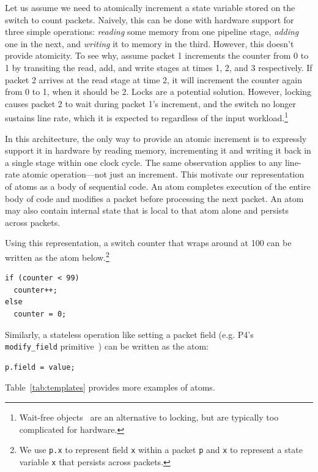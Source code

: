 Let us assume we need to atomically increment a state variable stored
on the switch to count packets. Naively, this can be done with
hardware support for three simple operations: \textit{reading} some
memory from one pipeline stage, \textit{adding} one in the next, and
\textit{writing} it to memory in the third. However, this doesn't
provide atomicity. To see why, assume packet 1 increments the counter
from 0 to 1 by transiting the read, add, and write stages at times 1,
2, and 3 respectively.  If packet 2 arrives at the read stage at time
2, it will increment the counter again from 0 to 1, when it should be
2.   Locks are a potential solution. However, locking causes
packet 2 to wait during packet 1's increment, and the switch no longer
sustains line rate, which it is expected to regardless of the input
workload.\footnote{Wait-free objects~\cite{herlihy_wait} are an
  alternative to locking, but are typically too complicated for
  hardware.}

In this architecture, the only way to provide an atomic increment is
to expressly support it in hardware by reading memory, incrementing it
and writing it back in a single stage within one clock cycle. The same
observation applies to any line-rate atomic operation---not just an
increment.  This motivate our representation of atoms as a body of
sequential code. An atom completes execution of the entire body of
code and modifies a packet before processing the next packet.  An atom
may also contain internal state that is local to that atom alone and
persists across packets.  

Using this representation, a switch counter that wraps around at 100
can be written as the atom below.\footnote{We use {\tt p.x} to
  represent field {\tt x} within a packet {\tt p} and {\tt x} to
  represent a state variable {\tt x} that persists across packets.}
\begin{lstlisting}[style=customc, numbers=none, frame=none]
if (counter < 99)
  counter++;
else
  counter = 0;
\end{lstlisting}
Similarly, a stateless operation like setting a packet field (e.g. P4's {\tt
modify\_field} primitive~\cite{p4spec}) can be written as the atom:
\begin{lstlisting}[style=customc, numbers=none, frame=none]
  p.field = value;
\end{lstlisting}
Table~\ref{tab:templates} provides more examples of atoms.

